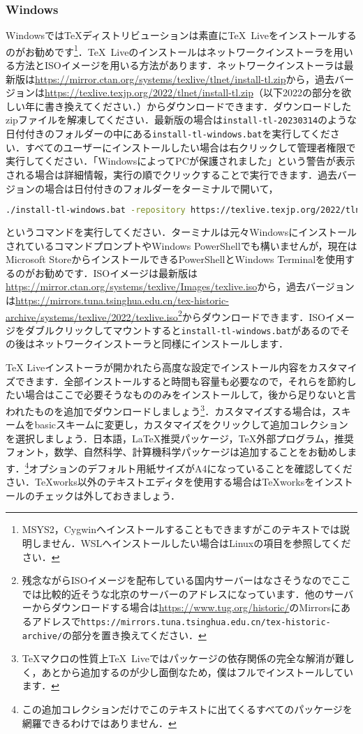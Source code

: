 \subsubsection*{Windows}
Windowsでは\TeX ディストリビューションは素直に\TeX\ Liveをインストールするのがお勧めです\footnote{MSYS2，Cygwinへインストールすることもできますがこのテキストでは説明しません．WSLへインストールしたい場合はLinuxの項目を参照してください．}．\TeX\ Liveのインストールはネットワークインストーラを用いる方法とISOイメージを用いる方法があります．ネットワークインストーラは最新版は\url{https://mirror.ctan.org/systems/texlive/tlnet/install-tl.zip}から，過去バージョンは\url{https://texlive.texjp.org/2022/tlnet/install-tl.zip}（以下2022の部分を欲しい年に書き換えてください．）からダウンロードできます．ダウンロードしたzipファイルを解凍してください．最新版の場合は\texttt{install-tl-20230314}のような日付付きのフォルダーの中にある\texttt{install-tl-windows.bat}を実行してください．すべてのユーザーにインストールしたい場合は右クリックして管理者権限で実行してください．「WindowsによってPCが保護されました」という警告が表示される場合は詳細情報，実行の順でクリックすることで実行できます．過去バージョンの場合は日付付きのフォルダーをターミナルで開いて，
\begin{lstlisting}[language=bash]
./install-tl-windows.bat -repository https://texlive.texjp.org/2022/tlnet/
\end{lstlisting}
というコマンドを実行してください．ターミナルは元々WindowsにインストールされているコマンドプロンプトやWindows PowerShellでも構いませんが，現在はMicrosoft StoreからインストールできるPowerShellとWindows Terminalを使用するのがお勧めです．ISOイメージは最新版は\url{https://mirror.ctan.org/systems/texlive/Images/texlive.iso}から，過去バージョンは\url{https://mirrors.tuna.tsinghua.edu.cn/tex-historic-archive/systems/texlive/2022/texlive.iso}\footnote{残念ながらISOイメージを配布している国内サーバーはなさそうなのでここでは比較的近そうな北京のサーバーのアドレスになっています．他のサーバーからダウンロードする場合は\url{https://www.tug.org/historic/}のMirrorsにあるアドレスで\texttt{https://mirrors.tuna.tsinghua.edu.cn/tex-historic-archive/}の部分を置き換えてください．}からダウンロードできます．ISOイメージをダブルクリックしてマウントすると\texttt{install-tl-windows.bat}があるのでその後はネットワークインストーラと同様にインストールします．

TeX Liveインストーラが開かれたら高度な設定でインストール内容をカスタマイズできます．全部インストールすると時間も容量も必要なので，それらを節約したい場合はここで必要そうなもののみをインストールして，後から足りないと言われたものを追加でダウンロードしましょう\footnote{\TeX マクロの性質上\TeX\ Liveではパッケージの依存関係の完全な解消が難しく，あとから追加するのが少し面倒なため，僕はフルでインストールしています．}．カスタマイズする場合は，スキームをbasicスキームに変更し，カスタマイズをクリックして追加コレクションを選択しましょう．日本語，LaTeX推奨パッケージ，TeX外部プログラム，推奨フォント，数学、自然科学、計算機科学パッケージは追加することをお勧めします．\footnote{この追加コレクションだけでこのテキストに出てくるすべてのパッケージを網羅できるわけではありません．}オプションのデフォルト用紙サイズがA4になっていることを確認してください．TeXworks以外のテキストエディタを使用する場合はTeXworksをインストールのチェックは外しておきましょう．

